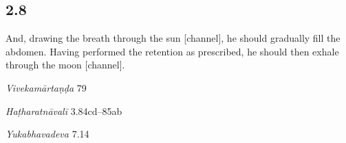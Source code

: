 \begin{ekdosis}
\begin{testimonia}[hp02_007]
\begin{versinnote}
\end{versinnote}
\end{testimonia}


\subsection*{2.8}
\begin{translation}[hp02_008]
And, drawing the breath through the sun [channel], he should gradually fill the abdomen. Having performed the retention as prescribed, he should then exhale through the moon [channel].
\end{translation}

\begin{sources}[hp02_008]
\emph{Vivekamārtaṇḍa} 79

\begin{versinnote}
\end{versinnote}
\end{sources}

\begin{testimonia}[hp02_008]
\emph{Haṭharatnāvalī} 3.84cd–85ab
\begin{versinnote}
\end{versinnote}

\emph{Yukabhavadeva} 7.14

\begin{versinnote}
\end{versinnote}
\end{testimonia}


\end{ekdosis}

